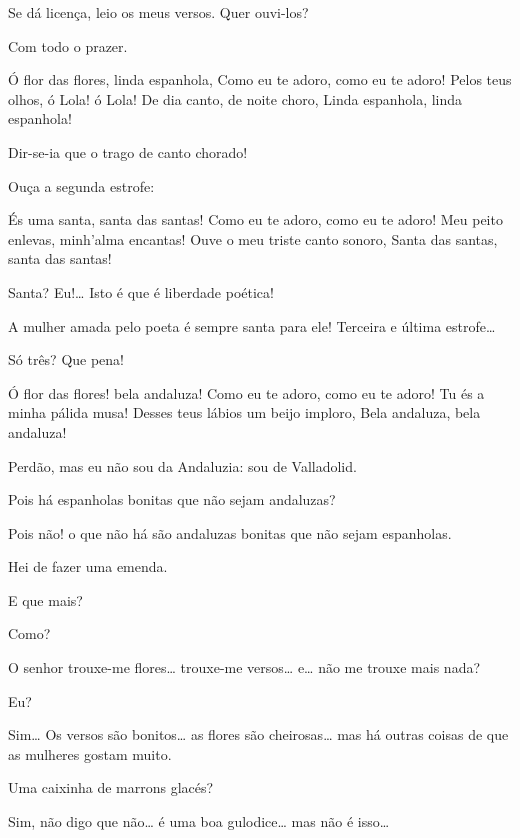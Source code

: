  Se dá licença, leio os meus versos.  Quer ouvi-los?

 Com todo o prazer.

 

 Ó flor das flores, linda espanhola,
 Como eu te adoro, como eu te adoro!
 Pelos teus olhos, ó Lola! ó Lola!
 De dia canto, de noite choro,
 Linda espanhola, linda espanhola!

 Dir-se-ia que o trago de canto chorado!

 Ouça a segunda estrofe:

 És uma santa, santa das santas!
 Como eu te adoro, como eu te adoro!
 Meu peito enlevas, minh’alma encantas!
 Ouve o meu triste canto sonoro,
 Santa das santas, santa das santas!

 Santa? Eu!\ldots{} Isto é que é liberdade poética!

 A mulher amada pelo poeta é sempre santa para ele! Terceira e
última estrofe\ldots{}

 Só três? Que pena!

 

 Ó flor das flores! bela andaluza!
 Como eu te adoro, como eu te adoro!
 Tu és a minha pálida musa!
 Desses teus lábios um beijo imploro,
 Bela andaluza, bela andaluza!

 Perdão, mas eu não sou da Andaluzia: sou de Valladolid.

 Pois há espanholas bonitas que não sejam andaluzas?

 Pois não! o que não há são andaluzas bonitas que não sejam
espanholas.

 Hei de fazer uma emenda.

 E que mais?

 Como?

 O senhor trouxe-me flores\ldots{} trouxe-me versos\ldots{} e\ldots{} não me trouxe
mais nada?

 Eu?

 Sim\ldots{} Os versos são bonitos\ldots{} as flores são cheirosas\ldots{} mas há
outras coisas de que as mulheres gostam muito.

 Uma caixinha de marrons glacés?

 Sim, não digo que não\ldots{} é uma boa gulodice\ldots{} mas não é isso\ldots{}

